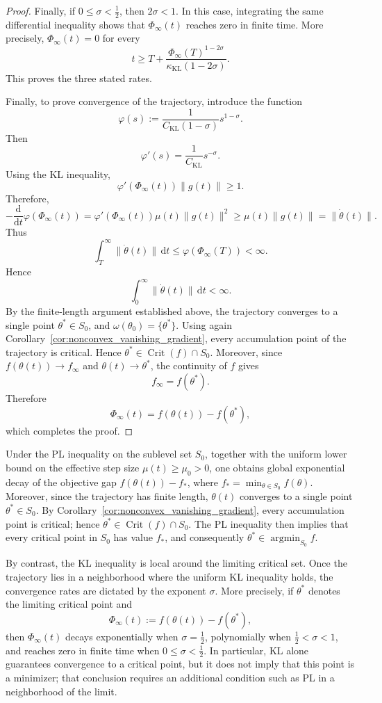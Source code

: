 \documentclass{article} %
\begin{document}
\begin{proof}
Finally, if \(0\leq\sigma<\frac12\), then \(2\sigma<1\). In this case, integrating the same differential inequality shows that \(\Phi_\infty(t)\) reaches zero in finite time. More precisely, $\Phi_\infty(t)=0$ for every
\[
    t
    \geq
    T+
    \frac{\Phi_\infty(T)^{1-2\sigma}}
    {\kappa_{\mathrm{KL}}(1-2\sigma)}.
\]
This proves the three stated rates.

Finally, to prove convergence of the trajectory, introduce the function
\[
    \varphi(s)
    :=
    \frac{1}{C_{\mathrm{KL}}(1-\sigma)}s^{1-\sigma}.
\]
Then
\[
    \varphi'(s)
    =
    \frac{1}{C_{\mathrm{KL}}}s^{-\sigma}.
\]
Using the KL inequality,
\[
    \varphi'(\Phi_\infty(t))\|g(t)\|
    \geq1.
\]
Therefore,
\[
    -\frac{\mathrm d}{\mathrm dt}\varphi(\Phi_\infty(t))
    =
    \varphi'(\Phi_\infty(t))\mu(t)\|g(t)\|^2
    \geq
    \mu(t)\|g(t)\|
    =
    \|\dot\theta(t)\|.
\]
Thus
\[
    \int_T^\infty\|\dot\theta(t)\|\,\mathrm dt
    \leq
    \varphi(\Phi_\infty(T))<\infty.
\]
Hence
\[
    \int_0^\infty \|\dot\theta(t)\|\,\mathrm dt<\infty .
\]
By the finite-length argument established above, the trajectory converges to a single point $\theta^*\in S_0$, and $\omega(\theta_0)=\{\theta^*\}$. Using again Corollary~\ref{cor:nonconvex_vanishing_gradient}, every accumulation point of the trajectory is critical. Hence $\theta^*\in\operatorname{Crit}(f)\cap S_0$. Moreover, since $f(\theta(t))\to f_\infty$ and $\theta(t)\to\theta^*$, the continuity of $f$ gives
\[
    f_\infty=f(\theta^*) .
\]
Therefore
\[
    \Phi_\infty(t)=f(\theta(t))-f(\theta^*) ,
\]
which completes the proof.
\end{proof}
Under the PL inequality on the sublevel set \(S_0\), together with the uniform lower bound on the effective step size \(\mu(t)\geq \mu_0>0\), one obtains global exponential decay of the objective gap \(f(\theta(t))-f_*\), where \(f_*=\min_{\theta\in S_0}f(\theta)\). Moreover, since the trajectory has finite length, \(\theta(t)\) converges to a single point \(\theta^*\in S_0\). By Corollary~\ref{cor:nonconvex_vanishing_gradient}, every accumulation point is critical; hence \(\theta^*\in\operatorname{Crit}(f)\cap S_0\). The PL inequality then implies that every critical point in \(S_0\) has value \(f_*\), and consequently \(\theta^*\in\operatorname{argmin}_{S_0}f\).

By contrast, the KL inequality is local around the limiting critical set. Once the trajectory lies in a neighborhood where the uniform KL inequality holds, the convergence rates are dictated by the exponent \(\sigma\). More precisely, if \(\theta^*\) denotes the limiting critical point and
\[
    \Phi_\infty(t):=f(\theta(t))-f(\theta^*),
\]
then \(\Phi_\infty(t)\) decays exponentially when \(\sigma=\tfrac12\), polynomially when \(\tfrac12<\sigma<1\), and reaches zero in finite time when \(0\leq\sigma<\tfrac12\). In particular, KL alone guarantees convergence to a critical point, but it does not imply that this point is a minimizer; that conclusion requires an additional condition such as PL in a neighborhood of the limit.
\end{document}
